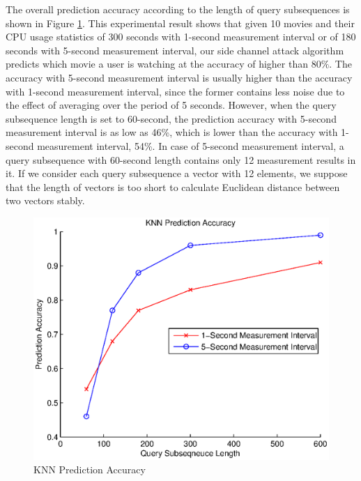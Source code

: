 The overall prediction accuracy according to the length of query subsequences is shown in Figure \ref{fig:knn_result}.
This experimental result shows that given 10 movies and their CPU usage statistics of 300 seconds with 1-second measurement interval or of 180 seconds with 5-second measurement interval, our side channel attack algorithm predicts which movie a user is watching at the accuracy of higher than 80$\%$.
The accuracy with 5-second measurement interval is usually higher than the accuracy with 1-second measurement interval, since the former contains less noise due to the effect of averaging over the period of 5 seconds. 
However, when the query subsequence length is set to 60-second, the prediction accuracy with 5-second measurement interval is as low as 46\%, which is lower than the accuracy with 1-second measurement interval, 54\%. 
In case of 5-second measurement interval, a query subsequence with 60-second length contains only 12 measurement results in it. 
If we consider each query subsequence a vector with 12 elements, we suppose that the length of vectors is too short to calculate Euclidean distance between two vectors stably. 


\begin{figure}[!t]
\centering
\includegraphics[scale=0.40]{Figures/knn_result}
\caption{KNN Prediction Accuracy}
\label{fig:knn_result}
\vspace{-5mm}
\end{figure}